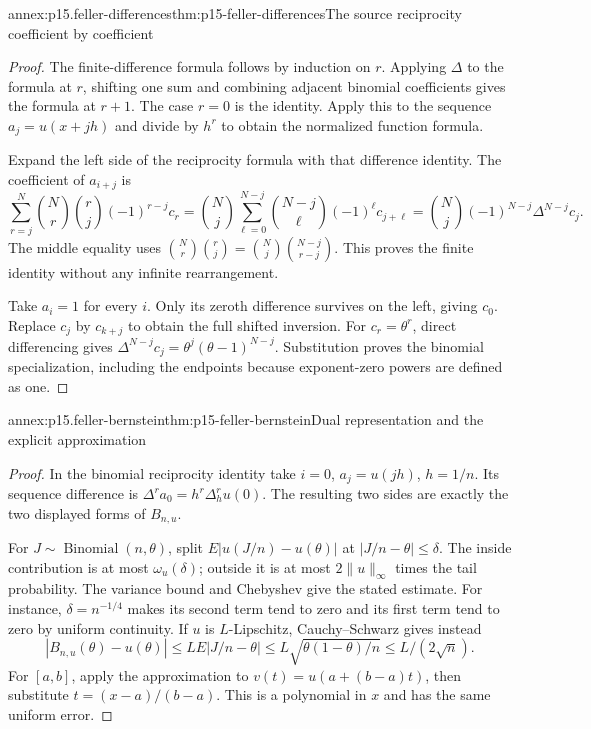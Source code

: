 \begin{annexitem}{annex:p15.feller-differences}{thm:p15-feller-differences}{The source reciprocity coefficient by coefficient}
\begin{proof}
The finite-difference formula follows by induction on \(r\).
Applying \(\Delta\) to the formula at \(r\), shifting one sum and
combining adjacent binomial coefficients gives the formula at \(r+1\).
The case \(r=0\) is the identity.
Apply this to the sequence \(a_j=u(x+jh)\) and divide by \(h^r\)
to obtain the normalized function formula.

Expand the left side of the reciprocity formula with that difference
identity. The coefficient of \(a_{i+j}\) is
\[
 \sum_{r=j}^N\binom Nr\binom rj(-1)^{r-j}c_r
   =\binom Nj\sum_{\ell=0}^{N-j}
                    \binom{N-j}{\ell}(-1)^\ell c_{j+\ell}
   =\binom Nj(-1)^{N-j}\Delta^{N-j}c_j.
\]
The middle equality uses
\(\binom Nr\binom rj=\binom Nj\binom{N-j}{r-j}\).
This proves the finite identity without any infinite rearrangement.

Take \(a_i=1\) for every \(i\).
Only its zeroth difference survives on the left, giving \(c_0\).
Replace \(c_j\) by \(c_{k+j}\) to obtain the full shifted inversion.
For \(c_r=\theta^r\), direct differencing gives
\(\Delta^{N-j}c_j=\theta^j(\theta-1)^{N-j}\).
Substitution proves the binomial specialization, including the
endpoints because exponent-zero powers are defined as one.
\end{proof}
\end{annexitem}

\begin{annexitem}{annex:p15.feller-bernstein}{thm:p15-feller-bernstein}{Dual representation and the explicit approximation}
\begin{proof}
In the binomial reciprocity identity take \(i=0\),
\(a_j=u(jh)\), \(h=1/n\). Its sequence difference is
\(\Delta^r a_0=h^r\Delta_h^r u(0)\).
The resulting two sides are exactly the two displayed forms of
\(B_{n,u}\).

For \(J\sim\operatorname{Binomial}(n,\theta)\), split
\(E|u(J/n)-u(\theta)|\) at \(|J/n-\theta|\leq\delta\).
The inside contribution is at most \(\omega_u(\delta)\);
outside it is at most \(2\|u\|_\infty\) times the tail probability.
The variance bound and Chebyshev give the stated estimate.
For instance, \(\delta=n^{-1/4}\) makes its second term tend to
zero and its first term tend to zero by uniform continuity.
If \(u\) is \(L\)-Lipschitz, Cauchy--Schwarz gives instead
\[
 |B_{n,u}(\theta)-u(\theta)|
     \leq L E|J/n-\theta|
     \leq L\sqrt{\theta(1-\theta)/n}\leq L/(2\sqrt n).
\]
For \([a,b]\), apply the approximation to
\(v(t)=u(a+(b-a)t)\), then substitute \(t=(x-a)/(b-a)\).
This is a polynomial in \(x\) and has the same uniform error.
\end{proof}
\end{annexitem}

